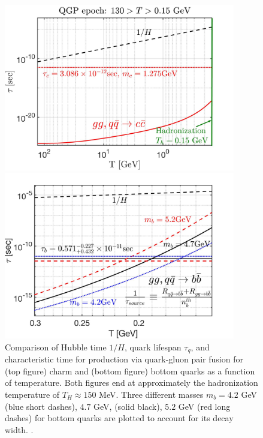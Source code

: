 \begin{figure}  
\centerline{\includegraphics[width=0.9\textwidth]{./plots/CharmQuark_QGP.jpg}}
\centerline{\includegraphics[width=0.9\textwidth]{./plots/BQuarkReactionTime_bottom.jpg}}
\caption{Comparison of Hubble time $1/H$, quark lifespan $\tau_{q}$, and characteristic time for production via quark-gluon pair fusion for (top figure) charm and (bottom figure) bottom quarks as a function of temperature. Both figures end at approximately the hadronization temperature of $T_{H}\approx150$ MeV. Three different masses $m_{b}=4.2$ GeV (blue short dashes), $4.7$ GeV, (solid black), $5.2$ GeV (red long dashes) for bottom quarks are plotted to account for its decay width. . }
\label{BCreaction_fig}
\end{figure}



